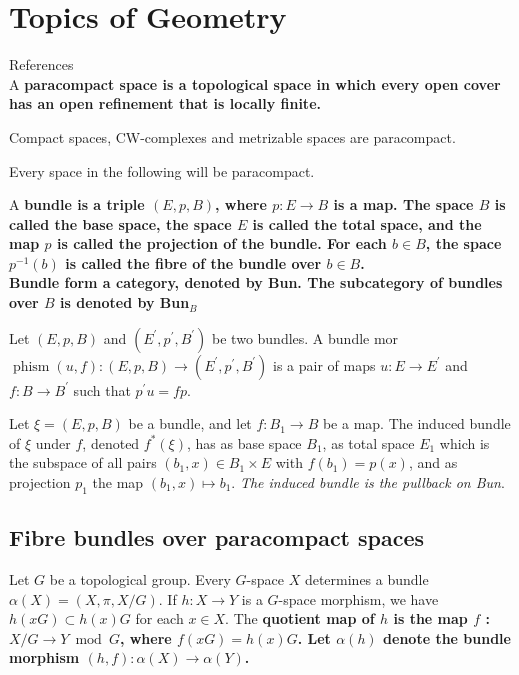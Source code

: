 \part{Topics of Geometry}

References \cite{husemollerFibreBundles1994,mayConciseCourseAlgebraic1999}\\

A \bf{paracompact space} is a topological space in which every open cover has an open refinement that is locally finite. 

\begin{theo}
Compact spaces, CW-complexes and metrizable spaces are paracompact.
\end{theo}

Every space in the following will be paracompact.

A \bf{bundle} is a triple $(E, p, B)$, where $p: E \rightarrow B$ is a map. The space $B$ is called the \bf{base space}, the space $E$ is called the \bf{total space}, and the map $p$ is called the \bf{projection of the bundle}. For each $b \in B$, the space $p^{-1}(b)$ is called the \bf{fibre} of the bundle over $b \in B$.\\ Bundle form a category, denoted by Bun. The subcategory of bundles over $B$ is denoted by Bun$_B$

Let $(E, p, B)$ and $\left(E^{\prime}, p^{\prime}, B^{\prime}\right)$ be two bundles. A bundle mor$\operatorname{phism}(u, f):(E, p, B) \rightarrow\left(E^{\prime}, p^{\prime}, B^{\prime}\right)$ is a pair of maps $u: E \rightarrow E^{\prime}$ and $f: B \rightarrow B^{\prime}$ such that $p^{\prime} u=f p$.

Let $\xi=(E, p, B)$ be a bundle, and let $f: B_1 \rightarrow B$ be a map. The induced bundle of $\xi$ under $f$, denoted $f^*(\xi)$, has as base space $B_1$, as total space $E_1$ which is the subspace of all pairs $\left(b_1, x\right) \in B_1 \times E$ with $f\left(b_1\right)=p(x)$, and as projection $p_1$ the map $\left(b_1, x\right) \mapsto b_1$. \textit{The induced bundle is the pullback on Bun}.\\

\chapter{Fibre bundles over paracompact spaces}


Let $G$ be a topological group. 
Every $G$-space $X$ determines a bundle $\alpha(X)=(X, \pi, X / G)$. If $h: X \rightarrow Y$ is a $G$-space morphism, we have $h(x G) \subset h(x) G$ for each $x \in X$. The \bf{quotient map of $h$} is the map $f$ : $X / G \rightarrow Y \bmod G$, where $f(x G)=h(x) G$. Let $\alpha(h)$ denote the bundle morphism $(h, f): \alpha(X) \rightarrow \alpha(Y)$.


